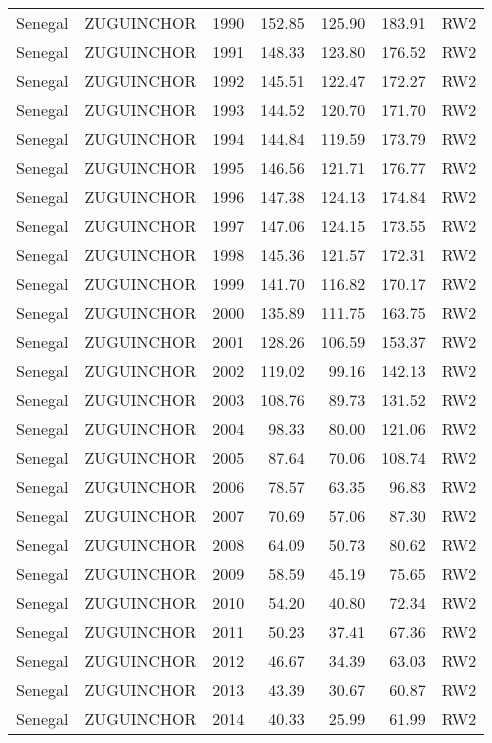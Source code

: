 \begin{longtable}{lllrrrl}
  Senegal & ZUGUINCHOR & 1990 & 152.85 & 125.90 & 183.91 & RW2 \\ 
  Senegal & ZUGUINCHOR & 1991 & 148.33 & 123.80 & 176.52 & RW2 \\ 
  Senegal & ZUGUINCHOR & 1992 & 145.51 & 122.47 & 172.27 & RW2 \\ 
  Senegal & ZUGUINCHOR & 1993 & 144.52 & 120.70 & 171.70 & RW2 \\ 
  Senegal & ZUGUINCHOR & 1994 & 144.84 & 119.59 & 173.79 & RW2 \\ 
  Senegal & ZUGUINCHOR & 1995 & 146.56 & 121.71 & 176.77 & RW2 \\ 
  Senegal & ZUGUINCHOR & 1996 & 147.38 & 124.13 & 174.84 & RW2 \\ 
  Senegal & ZUGUINCHOR & 1997 & 147.06 & 124.15 & 173.55 & RW2 \\ 
  Senegal & ZUGUINCHOR & 1998 & 145.36 & 121.57 & 172.31 & RW2 \\ 
  Senegal & ZUGUINCHOR & 1999 & 141.70 & 116.82 & 170.17 & RW2 \\ 
  Senegal & ZUGUINCHOR & 2000 & 135.89 & 111.75 & 163.75 & RW2 \\ 
  Senegal & ZUGUINCHOR & 2001 & 128.26 & 106.59 & 153.37 & RW2 \\ 
  Senegal & ZUGUINCHOR & 2002 & 119.02 & 99.16 & 142.13 & RW2 \\ 
  Senegal & ZUGUINCHOR & 2003 & 108.76 & 89.73 & 131.52 & RW2 \\ 
  Senegal & ZUGUINCHOR & 2004 & 98.33 & 80.00 & 121.06 & RW2 \\ 
  Senegal & ZUGUINCHOR & 2005 & 87.64 & 70.06 & 108.74 & RW2 \\ 
  Senegal & ZUGUINCHOR & 2006 & 78.57 & 63.35 & 96.83 & RW2 \\ 
  Senegal & ZUGUINCHOR & 2007 & 70.69 & 57.06 & 87.30 & RW2 \\ 
  Senegal & ZUGUINCHOR & 2008 & 64.09 & 50.73 & 80.62 & RW2 \\ 
  Senegal & ZUGUINCHOR & 2009 & 58.59 & 45.19 & 75.65 & RW2 \\ 
  Senegal & ZUGUINCHOR & 2010 & 54.20 & 40.80 & 72.34 & RW2 \\ 
  Senegal & ZUGUINCHOR & 2011 & 50.23 & 37.41 & 67.36 & RW2 \\ 
  Senegal & ZUGUINCHOR & 2012 & 46.67 & 34.39 & 63.03 & RW2 \\ 
  Senegal & ZUGUINCHOR & 2013 & 43.39 & 30.67 & 60.87 & RW2 \\ 
  Senegal & ZUGUINCHOR & 2014 & 40.33 & 25.99 & 61.99 & RW2 \\ 

\end{longtable}
